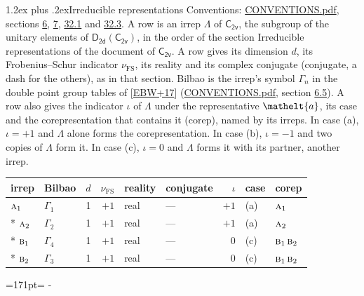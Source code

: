 \documentclass[10pt,a4paper]{article}
\makeatletter
\renewcommand\section{\@startsection{section}{1}{\z@}{-3ex plus -1ex minus -.2ex}%
  {1.2ex plus .2ex}{\normalfont\large\sffamily\bfseries\color{parttitle}}}
\newcommand{\needspace}[1]{\par\penalty-100\begingroup\dimen0=#1\relax\dimen2=\pagegoal
  \advance\dimen2-\pagetotal\ifdim\dimen0>\dimen2\relax\ifdim\dimen2>0pt\vfil\break\fi\fi
  \endgroup}
\numberwithin{equation}{section}
\newcommand{\eltfont}[1]{{\let\sigma\eltsigma\mathelt{#1}}}
\newcommand{\grp}[1]{\mathsf{#1}}
\newcommand{\irr}[1]{\text{\normalfont\scshape #1}}
\newcommand{\elt}[1]{\eltfont{#1}}
\newcommand{\fsind}{\nu_{\mathrm{FS}}}
\makeatother
\begin{document}
\section{Irreducible representations}\label{s:irreps}
Conventions: \href{../../CONVENTIONS.pdf}{CONVENTIONS.pdf}, sections \href{../../../rotation/CONVENTIONS.pdf\#conv.6}{6}, \href{../../../rotation/CONVENTIONS.pdf\#conv.7}{7}, \href{../../CONVENTIONS.pdf\#conv.32.1}{32.1} and \href{../../CONVENTIONS.pdf\#conv.32.3}{32.3}.
\leavevmode\label{n:irrep.Delta}A row is an irrep $\Lambda$ of $\grp{C_{2v}}$, the subgroup of the unitary elements of $\grp{D_{2d}}(\grp{C_{2v}})$, in the order of the section Irreducible representations of the document of \href{../../../rotation/data/pdf/C2v.pdf}{$\grp{C_{2v}}$}. \label{n:index.dimension}\label{n:index.frobenius}\label{n:head.irrep}\label{n:head.reality}\label{n:head.conjugate}A row gives its dimension $d$, its Frobenius--Schur indicator $\fsind$, its reality and its complex conjugate (conjugate, a dash for the others), as in that section. \label{n:head.bilbao}\label{n:irrep.alias.gamma}Bilbao is the irrep's symbol $\Gamma_n$ in the double point group tables of [\href{../../../REFERENCES.pdf\#ref.EBW+17}{EBW+17}] (\href{../../CONVENTIONS.pdf}{CONVENTIONS.pdf}, section \href{../../../rotation/CONVENTIONS.pdf\#conv.6.5}{6.5}). \label{n:head.case.corep}\label{n:head.corep}A row also gives the indicator $\iota$ of $\Lambda$ under the representative $\elt{a}$, its case and the corepresentation that contains it (corep), named by its irreps. In case (a), $\iota = +1$ and $\Lambda$ alone forms the corepresentation. In case (b), $\iota = -1$ and two copies of $\Lambda$ form it. In case (c), $\iota = 0$ and $\Lambda$ forms it with its partner, another irrep.
\setlength{\emergencystretch}{2em}\par\setlength{\emergencystretch}{0pt}
{\small\renewcommand{\arraystretch}{1.25}\setlength{\tabcolsep}{4pt}\begin{longtable}{@{}llrrllrll@{}}\toprule
irrep & Bilbao & $d$ & $\fsind$ & reality & conjugate & $\iota$ & case & corep\\\midrule\endhead
\bottomrule\endfoot\endlastfoot
$\irr{a}_{1}$ & $\Gamma_{1}$ & 1 & $+1$ & real & --- & $+1$ & (a) & $\irr{a}_{1}$\\*
$\irr{a}_{2}$ & $\Gamma_{2}$ & 1 & $+1$ & real & --- & $+1$ & (a) & $\irr{a}_{2}$\\*
$\irr{b}_{1}$ & $\Gamma_{4}$ & 1 & $+1$ & real & --- & $0$ & (c) & $\irr{b}_{1}\,\irr{b}_{2}$\\*
$\irr{b}_{2}$ & $\Gamma_{3}$ & 1 & $+1$ & real & --- & $0$ & (c) & $\irr{b}_{1}\,\irr{b}_{2}$\\
\bottomrule\end{longtable}}
\needspace{171pt}
\end{document}
